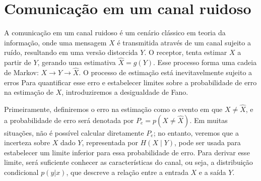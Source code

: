 \section{Comunicação em um canal ruidoso}
A comunicação em um canal ruidoso é um cenário clássico em teoria da informação, onde uma mensagem
$X$ é transmitida através de um canal sujeito a ruído, resultando em uma versão distorcida $Y$.
O receptor, tenta estimar $X$ a partir de $Y$, gerando uma estimativa $\hat{X} = g(Y)$.
Esse processo forma uma cadeia de Markov: $X \rightarrow Y \rightarrow \hat{X}$.
O processo de estimação está inevitavelmente sujeito a erros Para quantificar esse erro e estabelecer
limites sobre a probabilidade de erro na estimação de $X$, introduziremos a desigualdade de Fano.

Primeiramente, definiremos o erro na estimação como o evento em que $X \neq \hat{X}$, e a
probabilidade de erro será denotada por $P_e = p(X \neq \hat{X})$. Em muitas situações, não é
possível calcular diretamente $P_e$; no entanto, veremos que a incerteza sobre $X$ dado $Y$, 
representada por $H(X∣Y)$, pode ser usada para estabelecer um
limite inferior para essa probabilidade de erro. Para derivar esse limite, será
suficiente conhecer as características do canal, ou seja, a distribuição
condicional $p(y|x)$, que descreve a relação entre a entrada $X$ e a saída $Y$.



